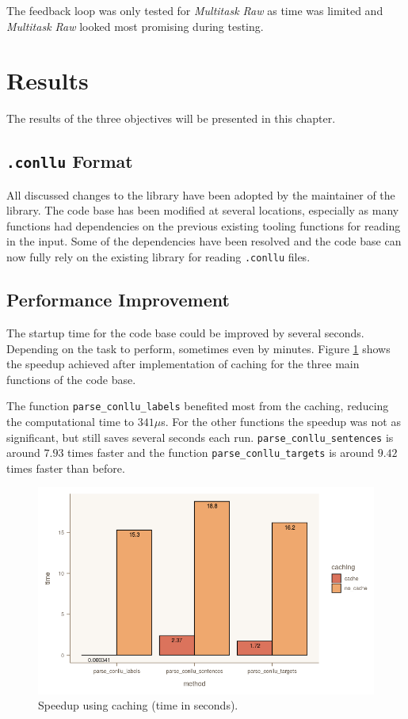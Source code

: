 \documentclass[11pt]{scrartcl}
\begin{document}
The feedback loop was only tested for \textit{Multitask Raw} as time was limited and \textit{Multitask Raw} looked most promising during testing.

\section{Results}

The results of the three objectives will be presented in this chapter.

\subsection{\texttt{.conllu} Format}

All discussed changes to the library have been adopted by the maintainer of the library. The code base has been modified at several locations, especially as many functions had dependencies on the previous existing tooling functions for reading in the input. Some of the dependencies have been resolved and the code base can now fully rely on the existing library for reading \texttt{.conllu} files.

\subsection{Performance Improvement}

The startup time for the code base could be improved by several seconds. Depending on the task to perform, sometimes even by minutes. Figure \ref{fig:cache_speedup} shows the speedup achieved after implementation of caching for the three main functions of the code base.

The function \texttt{parse\_conllu\_labels} benefited most from the caching, reducing the computational time to $341\mu$s. For the other functions the speedup was not as significant, but still saves several seconds each run. \texttt{parse\_conllu\_sentences} is around $7.93$ times faster and the function \texttt{parse\_conllu\_targets} is around $9.42$ times faster than before.

\begin{figure}[hbt]
	\center
	\includegraphics[width=1.0\textwidth]{img/cache_speedup.png}
	\caption{Speedup using caching (time in seconds).}
	\label{fig:cache_speedup}
\end{figure}
\end{document}
